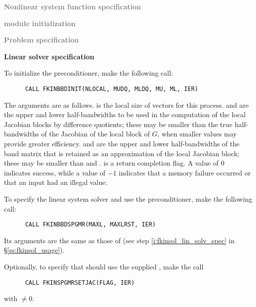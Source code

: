 \begin{Steps}
  
\item \textcolor{gray}{\bf Nonlinear system function specification}

\item \textcolor{gray}{\bf {\nvector} module initialization}

\item \textcolor{gray}{\bf Problem specification}

\item {\bf Linear solver specification}

  To initialize the {\kinbbdpre} preconditioner, make the following call:
\begin{verbatim}
      CALL FKINBBDINIT(NLOCAL, MUDQ, MLDQ, MU, ML, IER)
\end{verbatim}
  The arguments are as follows.
   is the local size of vectors for this process.
   and  are the upper and lower half-bandwidths to be used
  in the computation of the local Jacobian blocks by difference quotients;
  these may be smaller than the true half-bandwidths of the Jacobian of the
  local block of $G$, when smaller values may provide greater efficiency.
   and  are the upper and lower half-bandwidths of the band
  matrix that is retained as an approximation of the local Jacobian block;
  these may be smaller than  and .
   is a return completion flag.  A value of $0$ indicates success, while
  a value of $-1$ indicates that a memory failure occurred or that an input had
  an illegal value.
  
  To specify the {\spgmr} linear system solver and use the {\kinbbdpre}
  preconditioner, make the following call:
\begin{verbatim}
      CALL FKINBBDSPGMR(MAXL, MAXLRST, IER)
\end{verbatim}
  Its arguments are the same as those of 
  (see step \ref{i:fkinsol_lin_solv_spec} in \S\ref{ss:fkinsol_usage}).
  
  Optionally, to specify that {\spgmr} should use the supplied , 
  make the call
\begin{verbatim}
      CALL FKINSPGMRSETJAC(FLAG, IER)
\end{verbatim}
  with  $\neq 0$.
  

\end{Steps}

